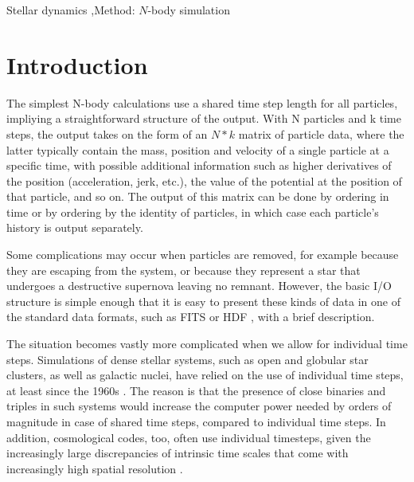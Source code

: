 \documentclass[5p,authoryear]{elsarticle}
\begin{document}
\begin{keyword}
  Stellar dynamics \sep Method: $N$-body simulation
\end{keyword}

\maketitle

\section{Introduction}

The simplest N-body calculations use a shared time step length for all
particles, impliying a straightforward structure of the output.  With
N particles and k time steps, the output takes on the form of an $N*k$
matrix of particle data, where the latter typically contain the mass,
position and velocity of a single particle at a specific time, with
possible additional information such as higher derivatives of the
position (acceleration, jerk, etc.), the value of the potential at the
position of that particle, and so on.  The output of this matrix can
be done by ordering in time or by ordering by the identity of
particles, in which case each particle's history is output separately.

Some complications may occur when particles are removed, for example
because they are escaping from the system, or because they represent a
star that undergoes a destructive supernova leaving no remnant.
However, the basic I/O structure is simple enough that it is easy to
present these kinds of data in one of the standard data formats, such
as FITS \citep{Pence2010} or HDF \citep{HDF2011}, with a brief
description.

The situation becomes vastly more complicated when we allow for
individual time steps.  Simulations of dense stellar systems, such as
open and globular star clusters, as well as galactic nuclei, have
relied on the use of individual time steps, at least since the 1960s
\citep{Aarseth2009}.  The reason is that the presence of close
binaries and triples in such systems would increase the computer power
needed by orders of magnitude in case of shared time steps, compared
to individual time steps.  In addition, cosmological codes, too, often
use individual timesteps, given the increasingly large discrepancies
of intrinsic time scales that come with increasingly high spatial
resolution \citep[e.g.][]{Springel2005}.
\end{document}
